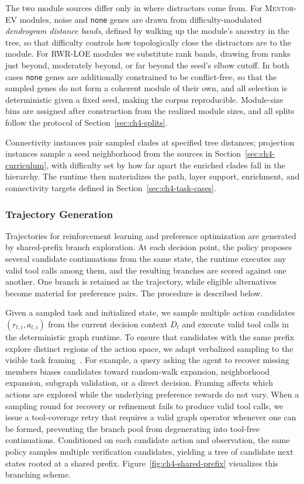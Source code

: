 \documentclass[thesis,letterpaper,12pt]{utthesis}
\begin{document}
The two module sources differ only in where distractors come from. For \textsc{Mentor-EV} modules, noise and \texttt{none} genes are drawn from difficulty-modulated \textit{dendrogram distance bands}, defined by walking up the module's ancestry in the tree, so that difficulty controls how topologically close the distractors are to the module. For RWR-LOE modules we substitute rank bands, drawing from ranks just beyond, moderately beyond, or far beyond the seed's elbow cutoff. In both cases \texttt{none} genes are additionally constrained to be conflict-free, so that the sampled genes do not form a coherent module of their own, and all selection is deterministic given a fixed seed, making the corpus reproducible. Module-size bins are assigned after construction from the realized module sizes, and all splits follow the protocol of Section~\ref{sec:ch4-splits}.

Connectivity instances pair sampled clades at specified tree distances; projection instances sample a seed neighborhood from the sources in Section~\ref{sec:ch4-curriculum}, with difficulty set by how far apart the enriched clades fall in the hierarchy. The runtime then materializes the path, layer support, enrichment, and connectivity targets defined in Section~\ref{sec:ch4-task-cases}.

\subsubsection{Trajectory Generation}\label{sec:ch4-traj-gen}
Trajectories for reinforcement learning and preference optimization are generated by shared-prefix branch exploration. At each decision point, the policy proposes several candidate continuations from the same state, the runtime executes any valid tool calls among them, and the resulting branches are scored against one another. One branch is retained as the trajectory, while eligible alternatives become material for preference pairs. The procedure is described below.

Given a sampled task and initialized state, we sample multiple action candidates $(r_{t,i}, a_{t,i})$ from the current decision context $D_t$ and execute valid tool calls in the deterministic graph runtime. To ensure that candidates with the same prefix explore distinct regions of the action space, we adapt verbalized sampling to the visible task framing~\cite{zhang2025verbalized}. For example, a query asking the agent to recover missing members biases candidates toward random-walk expansion, neighborhood expansion, subgraph validation, or a direct decision. Framing affects which actions are explored while the underlying preference rewards do not vary. When a sampling round for recovery or refinement fails to produce valid tool calls, we issue a tool-coverage retry that requires a valid graph operator whenever one can be formed, preventing the branch pool from degenerating into tool-free continuations. Conditioned on each candidate action and observation, the same policy samples multiple verification candidates, yielding a tree of candidate next states rooted at a shared prefix. Figure~\ref{fig:ch4-shared-prefix} visualizes this branching scheme.
\end{document}
